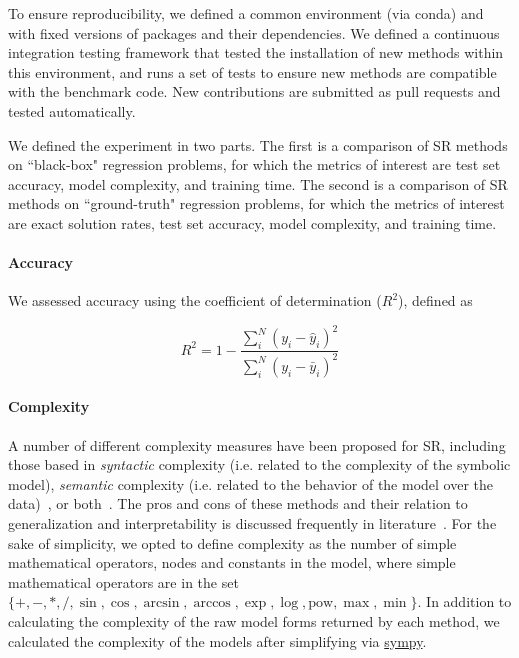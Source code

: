 To ensure reproducibility, we defined a common environment (via conda) and with fixed versions of packages and their dependencies. 
We defined a continuous integration testing framework that tested the installation of new methods within this environment, and runs a set of tests to ensure new methods are compatible with the benchmark code.  
New contributions are submitted as pull requests and tested automatically.

We defined the experiment in two parts.
The first is a comparison of SR methods on ``black-box" regression problems, for which the metrics of interest are test set accuracy, model complexity, and training time. 
The second is a comparison of SR methods on ``ground-truth" regression problems, for which the metrics of interest are exact solution rates, test set accuracy, model complexity, and training time. 

\paragraph{Accuracy}
We assessed accuracy using the coefficient of determination ($R^2$), defined as 

\begin{equation}
    R^2 = 1 - \frac{\sum_i^N{(y_i - \hat{y}_i)^2}}
                   {\sum_i^N{(y_i - \bar{y}_i)^2}}
\end{equation}

\paragraph{Complexity}
A number of different complexity measures have been proposed for SR, including those based in \textit{syntactic} complexity (i.e. related to the complexity of the symbolic model), \textit{semantic} complexity (i.e. related to the behavior of the model over the data)~\cite{vladislavlevaOrderNonlinearityComplexity2009a,udrescuAIFeynmanParetooptimal2020}, or both~\cite{kommendamichaelEvolvingSimpleSymbolic2015}. 
The pros and cons of these methods and their relation to generalization and interpretability is discussed frequently in literature~\cite{murdochDefinitionsMethodsApplications2019}. 
For the sake of simplicity, we opted to define complexity as the number of simple mathematical operators, nodes and constants in the model, where simple mathematical operators are in the set 
$\{+,
    -,
    *,
    {/},
    \sin,
    \cos,
    \arcsin,
    \arccos,
    \exp,
    \log, 
\text{pow},
\max,
\min \}$. 
In addition to calculating the complexity of the raw model forms returned by each method, we calculated the complexity of the models after simplifying via \href{https://www.sympy.org/en/index.html}{sympy}.

